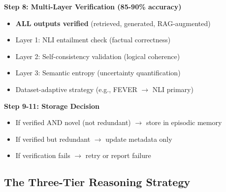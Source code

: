 \documentclass[12pt,a4paper]{article}
\theoremstyle{definition}
\begin{document}
\textbf{Step 8: Multi-Layer Verification (85-90\% accuracy)}
\begin{itemize}
    \item \textbf{ALL outputs verified} (retrieved, generated, RAG-augmented)
    \item Layer 1: NLI entailment check (factual correctness)
    \item Layer 2: Self-consistency validation (logical coherence)
    \item Layer 3: Semantic entropy (uncertainty quantification)
    \item Dataset-adaptive strategy (e.g., FEVER $\rightarrow$ NLI primary)
\end{itemize}

\textbf{Step 9-11: Storage Decision}
\begin{itemize}
    \item If verified AND novel (not redundant) $\rightarrow$ store in episodic memory
    \item If verified but redundant $\rightarrow$ update metadata only
    \item If verification fails $\rightarrow$ retry or report failure
\end{itemize}

\subsection{The Three-Tier Reasoning Strategy}
\end{document}
